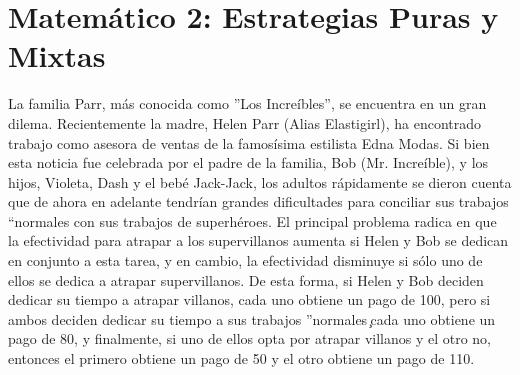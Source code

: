 \documentclass{exam}
\begin{document}
\newpage

\section{Matemático 2: Estrategias Puras y Mixtas}
La familia Parr, más conocida como ”Los Increíbles”, se encuentra en un gran dilema. Recientemente la madre, Helen Parr (Alias Elastigirl), ha encontrado trabajo como asesora de ventas de la famosísima estilista Edna Modas. Si bien esta noticia fue celebrada por el padre de la familia, Bob (Mr. Increíble), y los hijos, Violeta, Dash y el bebé Jack-Jack, los adultos rápidamente se dieron cuenta que de ahora en adelante tendrían grandes dificultades para conciliar sus trabajos “normales con sus trabajos de superhéroes. El principal problema radica en que la efectividad para atrapar a los supervillanos aumenta si Helen y Bob se dedican en conjunto a esta tarea, y en cambio, la efectividad disminuye si sólo uno de ellos se dedica a atrapar supervillanos. De esta forma, si Helen y Bob deciden dedicar su tiempo a atrapar villanos, cada uno
obtiene un pago de 100, pero si ambos deciden dedicar su tiempo a sus trabajos ”normales ̧cada uno obtiene
un pago de 80, y finalmente, si uno de ellos opta por atrapar villanos y el otro no, entonces el primero obtiene
un pago de 50 y el otro obtiene un pago de 110.
\end{document}
